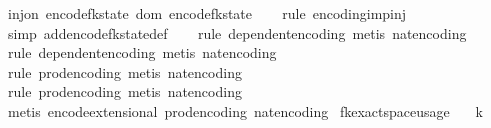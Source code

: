 \begin{isabellebody}
\isanewline
{}\isamarkupfalse%
\ {\isachardoublequoteopen}inj{\isacharunderscore}{\kern0pt}on\ encode{\isacharunderscore}{\kern0pt}fk{\isacharunderscore}{\kern0pt}state\ {\isacharparenleft}{\kern0pt}dom\ encode{\isacharunderscore}{\kern0pt}fk{\isacharunderscore}{\kern0pt}state{\isacharparenright}{\kern0pt}{\isachardoublequoteclose}\isanewline
%
\isadelimproof
\ \ %
\endisadelimproof
%
\isatagproof
{}\isamarkupfalse%
\ {\isacharparenleft}{\kern0pt}rule\ encoding{\isacharunderscore}{\kern0pt}imp{\isacharunderscore}{\kern0pt}inj{\isacharparenright}{\kern0pt}\isanewline
\ \ \isamarkupfalse%
\ {\isacharparenleft}{\kern0pt}simp\ add{\isacharcolon}{\kern0pt}encode{\isacharunderscore}{\kern0pt}fk{\isacharunderscore}{\kern0pt}state{\isacharunderscore}{\kern0pt}def{\isacharparenright}{\kern0pt}\isanewline
\ \ \isamarkupfalse%
\ {\isacharparenleft}{\kern0pt}rule\ dependent{\isacharunderscore}{\kern0pt}encoding{\isacharcomma}{\kern0pt}\ metis\ nat{\isacharunderscore}{\kern0pt}encoding{\isacharparenright}{\kern0pt}\isanewline
\ \ \isamarkupfalse%
\ {\isacharparenleft}{\kern0pt}rule\ dependent{\isacharunderscore}{\kern0pt}encoding{\isacharcomma}{\kern0pt}\ metis\ nat{\isacharunderscore}{\kern0pt}encoding{\isacharparenright}{\kern0pt}\isanewline
\ \ \isamarkupfalse%
\ {\isacharparenleft}{\kern0pt}rule\ prod{\isacharunderscore}{\kern0pt}encoding{\isacharcomma}{\kern0pt}\ metis\ nat{\isacharunderscore}{\kern0pt}encoding{\isacharparenright}{\kern0pt}\isanewline
\ \ \isamarkupfalse%
\ {\isacharparenleft}{\kern0pt}rule\ prod{\isacharunderscore}{\kern0pt}encoding{\isacharcomma}{\kern0pt}\ metis\ nat{\isacharunderscore}{\kern0pt}encoding{\isacharparenright}{\kern0pt}\isanewline
\ \ \isamarkupfalse%
\ {\isacharparenleft}{\kern0pt}metis\ encode{\isacharunderscore}{\kern0pt}extensional\ prod{\isacharunderscore}{\kern0pt}encoding\ nat{\isacharunderscore}{\kern0pt}encoding{\isacharparenright}{\kern0pt}%
\endisatagproof
{\isafoldproof}%
%
\isadelimproof
\isanewline
%
\endisadelimproof
\isanewline
{}\isamarkupfalse%
\ fk{\isacharunderscore}{\kern0pt}exact{\isacharunderscore}{\kern0pt}space{\isacharunderscore}{\kern0pt}usage{\isacharcolon}{\kern0pt}\isanewline
\ \ \ {\isachardoublequoteopen}k\ {\isasymge}\ {}{\isachardoublequoteclose}\isanewline
\ \ \ {\isachardoublequoteopen}{\isasymepsilon}\ {\isasymin}\ {\isacharbraceleft}{\kern0pt}{}{\isacharless}{\kern0pt}{\isachardot}{\kern0pt}{\isachardot}{\kern0pt}{\isacharless}{\kern0pt}{}{\isacharbraceright}{\kern0pt}{\isachardoublequoteclose}\isanewline

\end{isabellebody}
